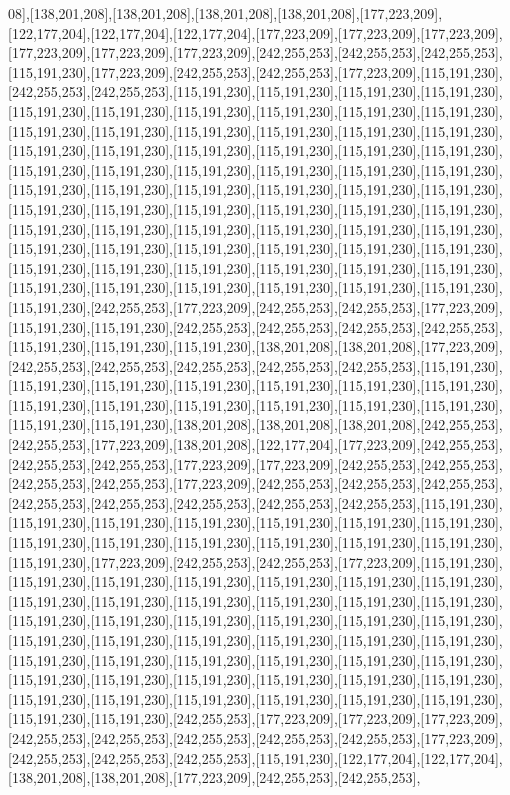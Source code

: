 08],[138,201,208],[138,201,208],[138,201,208],[138,201,208],[177,223,209],[122,177,204],[122,177,204],[122,177,204],[177,223,209],[177,223,209],[177,223,209],[177,223,209],[177,223,209],[177,223,209],[242,255,253],[242,255,253],[242,255,253],[115,191,230],[177,223,209],[242,255,253],[242,255,253],[177,223,209],[115,191,230],[242,255,253],[242,255,253],[115,191,230],[115,191,230],[115,191,230],[115,191,230],[115,191,230],[115,191,230],[115,191,230],[115,191,230],[115,191,230],[115,191,230],[115,191,230],[115,191,230],[115,191,230],[115,191,230],[115,191,230],[115,191,230],[115,191,230],[115,191,230],[115,191,230],[115,191,230],[115,191,230],[115,191,230],[115,191,230],[115,191,230],[115,191,230],[115,191,230],[115,191,230],[115,191,230],[115,191,230],[115,191,230],[115,191,230],[115,191,230],[115,191,230],[115,191,230],[115,191,230],[115,191,230],[115,191,230],[115,191,230],[115,191,230],[115,191,230],[115,191,230],[115,191,230],[115,191,230],[115,191,230],[115,191,230],[115,191,230],[115,191,230],[115,191,230],[115,191,230],[115,191,230],[115,191,230],[115,191,230],[115,191,230],[115,191,230],[115,191,230],[115,191,230],[115,191,230],[115,191,230],[115,191,230],[115,191,230],[115,191,230],[115,191,230],[115,191,230],[115,191,230],[115,191,230],[242,255,253],[177,223,209],[242,255,253],[242,255,253],[177,223,209],[115,191,230],[115,191,230],[242,255,253],[242,255,253],[242,255,253],[242,255,253],[115,191,230],[115,191,230],[115,191,230],[138,201,208],[138,201,208],[177,223,209],[242,255,253],[242,255,253],[242,255,253],[242,255,253],[242,255,253],[115,191,230],[115,191,230],[115,191,230],[115,191,230],[115,191,230],[115,191,230],[115,191,230],[115,191,230],[115,191,230],[115,191,230],[115,191,230],[115,191,230],[115,191,230],[115,191,230],[115,191,230],[138,201,208],[138,201,208],[138,201,208],[242,255,253],[242,255,253],[177,223,209],[138,201,208],[122,177,204],[177,223,209],[242,255,253],[242,255,253],[242,255,253],[177,223,209],[177,223,209],[242,255,253],[242,255,253],[242,255,253],[242,255,253],[177,223,209],[242,255,253],[242,255,253],[242,255,253],[242,255,253],[242,255,253],[242,255,253],[242,255,253],[242,255,253],[115,191,230],[115,191,230],[115,191,230],[115,191,230],[115,191,230],[115,191,230],[115,191,230],[115,191,230],[115,191,230],[115,191,230],[115,191,230],[115,191,230],[115,191,230],[115,191,230],[177,223,209],[242,255,253],[242,255,253],[177,223,209],[115,191,230],[115,191,230],[115,191,230],[115,191,230],[115,191,230],[115,191,230],[115,191,230],[115,191,230],[115,191,230],[115,191,230],[115,191,230],[115,191,230],[115,191,230],[115,191,230],[115,191,230],[115,191,230],[115,191,230],[115,191,230],[115,191,230],[115,191,230],[115,191,230],[115,191,230],[115,191,230],[115,191,230],[115,191,230],[115,191,230],[115,191,230],[115,191,230],[115,191,230],[115,191,230],[115,191,230],[115,191,230],[115,191,230],[115,191,230],[115,191,230],[115,191,230],[115,191,230],[115,191,230],[115,191,230],[115,191,230],[115,191,230],[115,191,230],[115,191,230],[115,191,230],[115,191,230],[242,255,253],[177,223,209],[177,223,209],[177,223,209],[242,255,253],[242,255,253],[242,255,253],[242,255,253],[242,255,253],[177,223,209],[242,255,253],[242,255,253],[242,255,253],[115,191,230],[122,177,204],[122,177,204],[138,201,208],[138,201,208],[177,223,209],[242,255,253],[242,255,253],